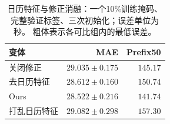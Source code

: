 \begin{table}[t]
\centering\footnotesize\setlength{\tabcolsep}{4pt}
\caption{日历特征与修正消融：一个10\%训练掩码、完整验证标签、三次初始化；误差单位为秒。 粗体表示各可比组内的最低误差。}\label{tab:mechanism}
\begin{tabular}{lrr}\toprule
变体 & MAE & Prefix50\\\midrule
关闭修正 & $29.035\pm0.175$ & $145.17$\\
去日历特征 & $28.612\pm0.160$ & $150.74$\\
Ours & $\mathbf{28.522\pm0.216}$ & $\mathbf{141.74}$\\
打乱日历特征 & $29.082\pm0.298$ & $157.30$\\
\bottomrule\end{tabular}
\end{table}
